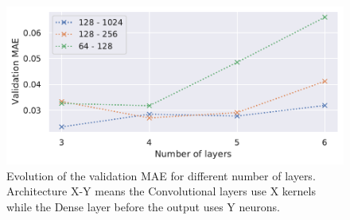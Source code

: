 \documentclass[reprint,amsmath,amssymb,aps,pra]{revtex4-2}
\begin{document}
\begin{figure}[H]
\includegraphics[width=\columnwidth]{analytical_continuation/CNN_nb_layers.pdf}
\caption{\label{fig:CNN_nb_layers}Evolution of the validation MAE for different number of layers. Architecture X-Y means the Convolutional layers use X kernels while the Dense layer before the output uses Y neurons.}
\end{figure}
\end{document}
